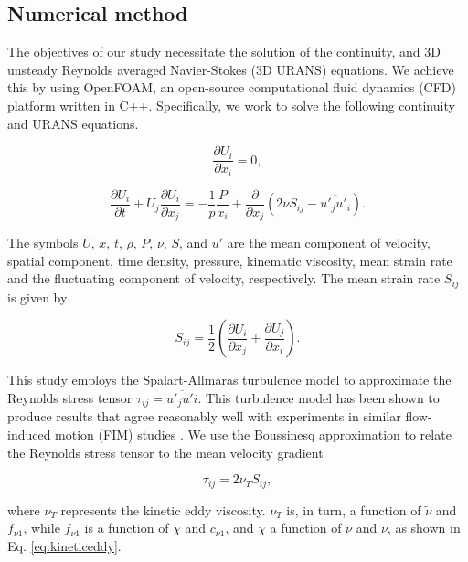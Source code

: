 \documentclass[a4paper,fleqn]{cas-sc}
\begin{document}
\subsection{Numerical method} \label{ssec:numMeth}
The objectives of our study necessitate the solution of the continuity, and 3D unsteady Reynolds averaged Navier-Stokes (3D URANS) equations. We achieve this by using OpenFOAM, an open-source computational fluid dynamics (CFD) platform written in C++. Specifically, we work to solve the following continuity and URANS equations.

\begin{equation}
  \frac{\partial U_{i}}{\partial x_{i}}=0,
  \label{eq:continuity}
\end{equation}

\begin{equation}
  \frac{\partial U_{i}}{\partial t}+U_{j}\frac{\partial U_{i}}{\partial x_{j}} = -\frac{1}{p}\frac{P}{x_{i}}+\frac{\partial}{\partial x_{j}} \left( 2\nu S_{ij}-\overline{u'_{j}u'_{i}} \right).
  \label{eq:navier-stokes}
\end{equation}

The symbols $U$, $x$, $t$, $\rho$, $P$, $\nu$, $S$, and $u'$ are the mean component of velocity, spatial component, time density, pressure, kinematic viscosity, mean strain rate and the fluctuating component of velocity, respectively. The mean strain rate $S_{ij}$ is given by

\begin{equation}
  S_{ij} = \frac{1}{2} \left( \frac{\partial U_{i}}{\partial x_{j}} + \frac{\partial U_{j}}{\partial x_{i}} \right).
  \label{eq:sij}
\end{equation}

This study employs the Spalart-Allmaras turbulence model to approximate the Reynolds stress tensor $\tau_{ij} = \overline{u'_{j}u'{i}}$. This turbulence model has been shown to produce results that agree reasonably well with experiments in similar flow-induced motion (FIM) studies \citep{Ding2015a,Ding2015b}. We use the Boussinesq approximation to relate the Reynolds stress tensor to the mean velocity gradient

\begin{equation}
  \tau_{ij} = 2 \nu_{T}S_{ij},
  \label{eq:tauij}
\end{equation}

\noindent where $\nu_{T}$ represents the kinetic eddy viscosity. $\nu_{T}$ is, in turn, a function of $\tilde{\nu}$ and $f_{\nu 1}$, while $f_{\nu 1}$ is a function of $\chi$ and $c_{\nu 1}$, and $\chi$ a function of $\tilde{\nu}$ and $\nu$, as shown in Eq. \ref{eq:kineticeddy}.
\end{document}

